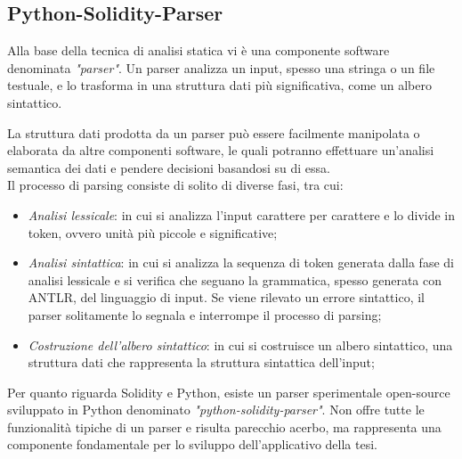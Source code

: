 {\subsection{Python-Solidity-Parser}
Alla base della tecnica di analisi statica vi è una componente software denominata \textit{"parser"}. Un parser analizza un input, spesso una stringa o un file testuale, e lo trasforma in una struttura dati più significativa, come un albero sintattico.\par
La struttura dati prodotta da un parser può essere facilmente manipolata o elaborata da altre componenti software, le quali potranno effettuare un'analisi semantica dei dati e pendere decisioni basandosi su di essa.\\ \newline
Il processo di parsing consiste di solito di diverse fasi, tra cui:
\begin{itemize}
	\item \textit{Analisi lessicale}: in cui si analizza l'input carattere per carattere e lo divide in token, ovvero unità più piccole e significative;
	\item \textit{Analisi sintattica}: in cui si analizza la sequenza di token generata dalla fase di analisi lessicale e si verifica che seguano la grammatica, spesso generata con ANTLR\cite{ANTLR}, del linguaggio di input. Se viene rilevato un errore sintattico, il parser solitamente lo segnala e interrompe il processo di parsing;
	\item \textit{Costruzione dell'albero sintattico}: in cui si costruisce un albero sintattico, una struttura dati che rappresenta la struttura sintattica dell'input;
\end{itemize}
Per quanto riguarda Solidity e Python, esiste un parser sperimentale open-source sviluppato in Python denominato \textit{"python-solidity-parser"}\cite{python-solidity-parser}. Non offre tutte le funzionalità tipiche di un parser e risulta parecchio acerbo, ma rappresenta una componente fondamentale per lo sviluppo dell'applicativo della tesi.
}
